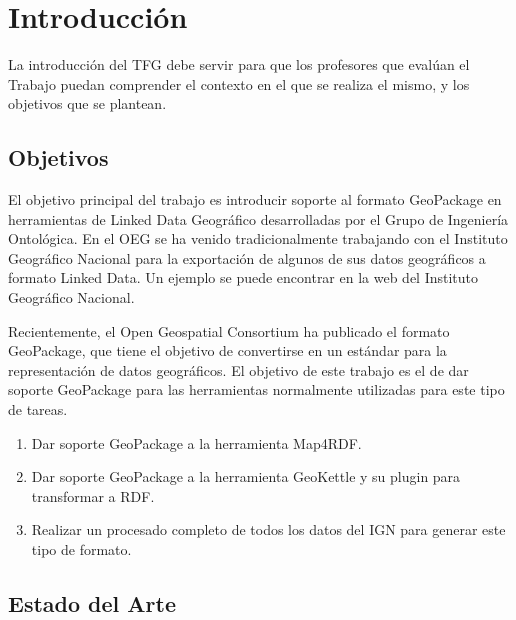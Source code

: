 \chapter{Introducción}
La introducción del TFG debe servir para que los profesores que evalúan el Trabajo puedan comprender el contexto
en el que se realiza el mismo, y los objetivos que se plantean.

\section{Objetivos} El objetivo principal del trabajo es introducir soporte al formato GeoPackage en herramientas
de Linked Data Geográfico desarrolladas por el Grupo de Ingeniería Ontológica. En el OEG se ha venido
tradicionalmente trabajando con el Instituto Geográfico Nacional para la exportación de algunos de sus datos
geográficos a formato Linked Data. Un ejemplo se puede encontrar en la web del Instituto Geográfico Nacional.
\cite{ign}

Recientemente, el Open Geospatial Consortium ha publicado el formato GeoPackage, que tiene el objetivo de
convertirse en un estándar para la representación de datos geográficos. El objetivo de este trabajo es el de dar
soporte GeoPackage para las herramientas normalmente utilizadas para este tipo de tareas.

\begin{enumerate} 
    \item Dar soporte GeoPackage a la herramienta Map4RDF. 
    \item Dar soporte GeoPackage a la herramienta GeoKettle y su plugin para transformar a RDF. 
    \item Realizar un procesado completo de todos los datos del IGN para generar este tipo de formato. 
\end{enumerate}

\section{Estado del Arte}

